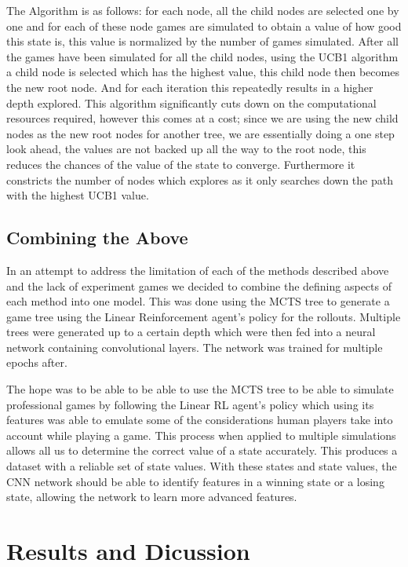 \documentclass[a4paper,12pt,table]{article}
\begin{document}
The Algorithm is as follows: for each node, all the child nodes are selected one by one and for each of these node games are simulated to obtain a value of how good this state is, this value is normalized by the number of games simulated. After all the games have been simulated for all the child nodes, using the UCB1 algorithm a child node is selected which has the highest value, this child node then becomes the new root node. And for each iteration this repeatedly results in a higher depth explored. This algorithm significantly cuts down on the computational resources required, however this comes at a cost; since we are using the new child nodes as the new root nodes for another tree, we are essentially doing a one step look ahead, the values are not backed up all the way to the root node, this reduces the chances of the value of the state to converge. Furthermore it constricts the number of nodes which explores as it only searches down the path with the highest UCB1 value. \par


\subsection{Combining the Above}

In an attempt to address the limitation of each of the methods described above and the lack of experiment games we decided to combine the defining aspects of each method into one model. This was done using the MCTS tree to generate a game tree using the Linear Reinforcement agent’s policy for the rollouts. Multiple trees were generated up to a certain depth which were then fed into a neural network containing convolutional layers. The network was trained for multiple epochs after. \par

The hope was to be able to be able to use the MCTS tree to be able to simulate professional games by following the Linear RL agent’s policy which using its features was able to emulate some of the considerations human players take into account while playing a game. This process when applied to multiple simulations allows all us to determine the correct value of a state accurately. This produces a dataset with a reliable set of state values. With these states and state values, the CNN network should be able to identify features in a winning state or a losing state, allowing the network to learn more advanced features. \par

\section{Results and Dicussion}
\end{document}
